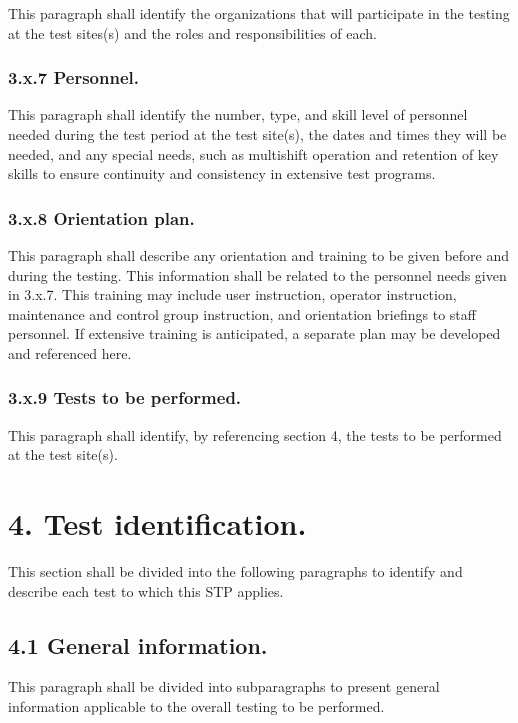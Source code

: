 This paragraph shall identify the organizations that will participate in
the testing at the test sites(s) and the roles and responsibilities of
each.

\subsubsection{3.x.7 Personnel.}

This paragraph shall identify the number, type, and skill level of
personnel needed during the test period at the test site(s), the dates
and times they will be needed, and any special needs, such as multishift
operation and retention of key skills to ensure continuity and
consistency in extensive test programs.

\subsubsection{3.x.8 Orientation plan.}

This paragraph shall describe any orientation and training to be given
before and during the testing. This information shall be related to the
personnel needs given in 3.x.7. This training may include user
instruction, operator instruction, maintenance and control group
instruction, and orientation briefings to staff personnel. If extensive
training is anticipated, a separate plan may be developed and referenced
here.

\subsubsection{3.x.9 Tests to be performed.}

This paragraph shall identify, by referencing section 4, the tests to be
performed at the test site(s).

\section{4. Test identification.}

This section shall be divided into the following paragraphs to identify
and describe each test to which this STP applies.

\subsection{4.1 General information.}

This paragraph shall be divided into subparagraphs to present general
information applicable to the overall testing to be performed.

